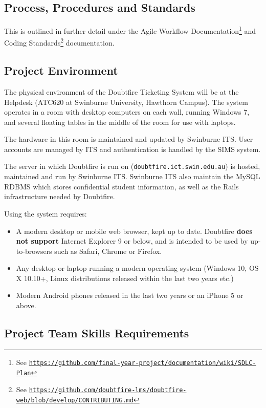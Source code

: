 \documentclass[a4paper,12pt]{article}
\renewcommand{\href}[2]{#2\footnote{See \texttt{\url{#1}}}}
\providecommand{\tightlist}{%
  \setlength{\itemsep}{0pt}\setlength{\parskip}{0pt}}
\begin{document}
\subsection{Process, Procedures and
Standards}\label{process-procedures-and-standards}

This is outlined in further detail under the
\href{https://github.com/final-year-project/documentation/wiki/SDLC-Plan}{Agile
Workflow Documentation} and
\href{https://github.com/doubtfire-lms/doubtfire-web/blob/develop/CONTRIBUTING.md}{Coding
Standards} documentation.

\subsection{Project Environment}\label{project-environment}

The physical environment of the Doubtfire Ticketing System will be at
the Helpdesk (ATC620 at Swinburne University, Hawthorn Campus). The
system operates in a room with desktop computers on each wall, running
Windows 7, and several floating tables in the middle of the room for use
with laptops.

The hardware in this room is maintained and updated by Swinburne ITS.
User accounts are managed by ITS and authentication is handled by the
SIMS system.

The server in which Doubtfire is run on
(\texttt{doubtfire.ict.swin.edu.au}) is hosted, maintained and run by
Swinburne ITS. Swinburne ITS also maintain the MySQL RDBMS which stores
confidential student information, as well as the Rails infrastructure
needed by Doubtfire.

Using the system requires:

\begin{itemize}
\tightlist
\item
  A modern desktop or mobile web browser, kept up to date. Doubtfire
  \textbf{does not support} Internet Explorer 9 or below, and is
  intended to be used by up-to-browsers such as Safari, Chrome or
  Firefox.
\item
  Any desktop or laptop running a modern operating system (Windows 10,
  OS X 10.10+, Linux distributions released within the last two years
  etc.)
\item
  Modern Android phones released in the last two years or an iPhone 5 or
  above.
\end{itemize}

\subsection{Project Team Skills
Requirements}\label{project-team-skills-requirements}
\end{document}
